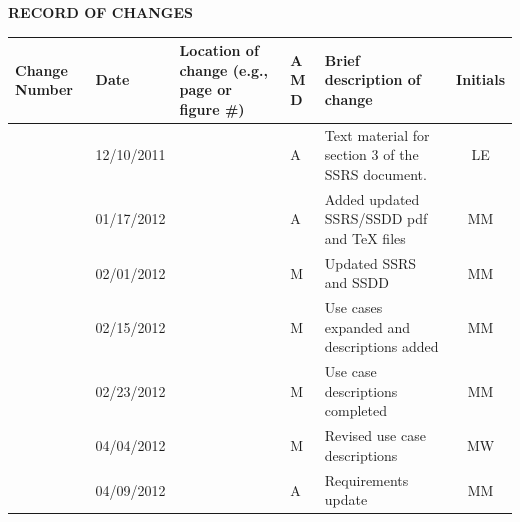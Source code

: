 \documentclass[twoside,letterpaper]{article}
\begin{document}


\bigskip





{\centering\bfseries RECORD OF CHANGES \par}


\bigskip

\begin{flushleft}
\tablehead{}
\begin{supertabular}[c]{|m{0.75in}|m{1.0in}|m{1.5in}|m{0.25in}|m{2in}|c|}
\hline

\centering \bfseries Change
\centering \bfseries Number
&

\centering \bfseries Date
\par
&

\centering \bfseries Location of change\newline
\centering \bfseries(e.g., page or figure \#)
&

\centering \bfseries A\newline
\centering \bfseries M\newline
\centering \bfseries D  
&

\centering \bfseries Brief description\newline
\centering \bfseries of change
&
\bfseries Initials
\\\hline

& 12/10/2011
& ~
& \centering A
& Text material for section 3 of the SSRS document.
& LE

\\\hline
{}
& 01/17/2012
& ~
& \centering A
& Added updated SSRS/SSDD pdf and TeX files
& MM

\\\hline
{}
& 02/01/2012
& ~
& \centering M
& Updated SSRS and SSDD
& MM

\\\hline
{}
& 02/15/2012
& ~
& \centering M
& Use cases expanded and descriptions added
& MM

\\\hline
{}
& 02/23/2012
& ~
& \centering M
& Use case descriptions completed
& MM

\\\hline
{}
& 04/04/2012
& ~
& \centering M
& Revised use case descriptions
& MW

\\\hline
{}
& 04/09/2012
& ~
& \centering A
& Requirements update
& MM
\\\hline
\end{supertabular}
\end{flushleft}
\end{document}
